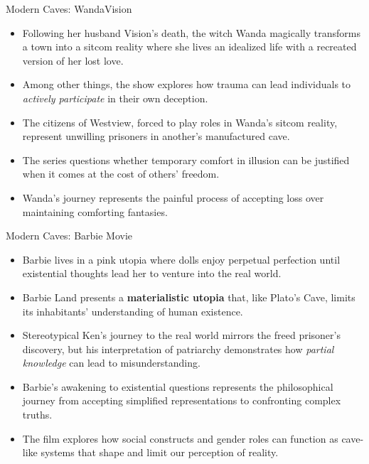 \documentclass[aspectratio=169]{beamer}
\begin{document}
    \begin{frame}{Modern Caves: WandaVision}
        \begin{itemize}
        \item Following her husband Vision's death, the witch Wanda magically transforms a town into a sitcom reality where she lives an idealized life with a recreated version of her lost love.
        \item Among other things, the show explores how trauma can lead individuals to \emph{actively participate} in their own deception.
        \item The citizens of Westview, forced to play roles in Wanda's sitcom reality, represent unwilling prisoners in another's manufactured cave.
        \item The series questions whether temporary comfort in illusion can be justified when it comes at the cost of others' freedom.
        \item Wanda's journey represents the painful process of accepting loss over maintaining comforting fantasies.
        \end{itemize}
    \end{frame}

    \begin{frame}{Modern Caves: Barbie Movie}
        \begin{itemize}
        \item Barbie lives in a pink utopia where dolls enjoy perpetual perfection until existential thoughts lead her to venture into the real world.
        \item Barbie Land presents a \textbf{materialistic utopia} that, like Plato's Cave, limits its inhabitants' understanding of human existence.
        \item Stereotypical Ken's journey to the real world mirrors the freed prisoner's discovery, but his interpretation of patriarchy demonstrates how \emph{partial knowledge} can lead to misunderstanding.
        \item Barbie's awakening to existential questions represents the philosophical journey from accepting simplified representations to confronting complex truths.
        \item The film explores how social constructs and gender roles can function as cave-like systems that shape and limit our perception of reality.
        \end{itemize}
    \end{frame}
\end{document}
